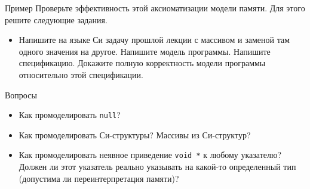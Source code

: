 \documentclass[hyperref={unicode=true}]{beamer}
\begin{document}
    \begin{frame}{Пример}
    Проверьте эффективность этой аксиоматизации
    модели памяти. Для этого решите следующие задания.
    \begin{itemize}
    \item Напишите на языке Си задачу прошлой лекции
    с массивом и заменой там одного значения на другое.
    Напишите модель программы. Напишите спецификацию.
    Докажите полную корректность модели программы
    относительно этой спецификации.
    \end{itemize}
    \end{frame}

    \begin{frame}{Вопросы}
    \begin{itemize}
    \item Как промоделировать \texttt{null}?
    \item Как промоделировать Си-структуры? Массивы
    из Си-структур?
    \item Как промоделировать неявное приведение
    \texttt{void *} к любому указателю? Должен ли
    этот указатель реально указывать на какой-то
    определенный тип (допустима ли переинтерпретация
    памяти)?
    \end{itemize}
    \end{frame}
\end{document}
